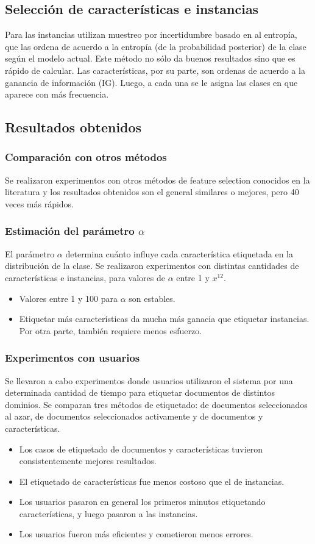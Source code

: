 \documentclass[11pt,spanish]{article}
\begin{document}
\subsection{Selección de características e instancias}
Para las instancias utilizan muestreo por incertidumbre basado en al entropía,
que las ordena de acuerdo a la entropía (de la probabilidad posterior) de la
clase según el modelo actual. Este método no sólo da buenos resultados sino
que es rápido de calcular.
Las características, por su parte, son ordenas de acuerdo a la ganancia de
información (IG). Luego, a cada una se le asigna las clases en que aparece con
más frecuencia.

\subsection{Resultados obtenidos}
\subsubsection{Comparación con otros métodos}
Se realizaron experimentos con otros métodos de feature selection conocidos en
la literatura y los resultados obtenidos son el general similares o mejores,
pero 40 veces más rápidos.
\subsubsection{Estimación del parámetro $\alpha$}
El parámetro $\alpha$ determina cuánto influye cada característica etiquetada
en la distribución de la clase. Se realizaron experimentos con distintas
cantidades de características e instancias, para valores de $\alpha$ entre 1 y
$x^{12}$.
\begin{itemize}
    \item Valores entre 1 y 100 para $\alpha$ son estables.
    \item Etiquetar más características da mucha más ganacia que etiquetar
    instancias. Por otra parte, también requiere menos esfuerzo.
\end{itemize}
\subsubsection{Experimentos con usuarios}
Se llevaron a cabo experimentos donde usuarios utilizaron el sistema por una
determinada cantidad de tiempo para etiquetar documentos de distintos dominios.
Se comparan tres métodos de etiquetado: de documentos seleccionados al azar,
de documentos seleccionados activamente y de documentos y características.
\begin{itemize}
    \item Los casos de etiquetado de documentos y características tuvieron
    consistentemente mejores resultados.
    \item El etiquetado de características fue menos costoso que el de
    instancias.
    \item Los usuarios pasaron en general los primeros minutos etiquetando
    características, y luego pasaron a las instancias.
    \item Los usuarios fueron más eficientes y cometieron menos errores. 
\end{itemize}
\end{document}
